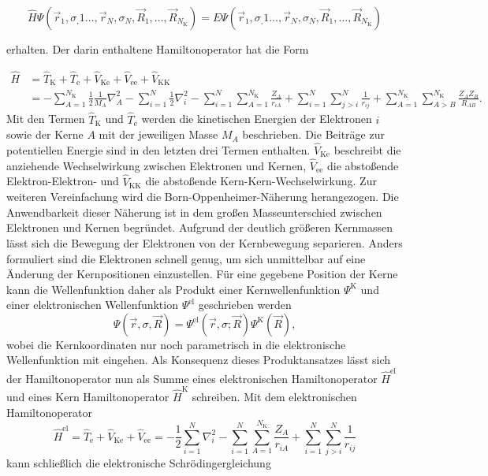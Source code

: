 \begin{equation}
  \hat{H}\Psi(\vec{r}_1,\sigma_,1\dotsc,\vec{r}_N,\sigma_N,\vec{R}_1,\dotsc,\vec{R}_{N_{\text{K}}})=E\Psi(\vec{r}_1,\sigma_,1\dotsc,\vec{r}_N,\sigma_N,\vec{R}_1,\dotsc,\vec{R}_{N_{\text{K}}})
\end{equation}

erhalten. Der darin enthaltene Hamiltonoperator hat die Form

\begin{equation}
\begin{aligned}
  \hat{H}&=\hat{T}_{\text{K}}+\hat{T}_{\text{e}}+\hat{V}_{\text{Ke}}+\hat{V}_{\text{ee}}+\hat{V}_{\text{KK}}\\
  &=-\sum_{A=1}^{N_\text{K}}\frac{1}{2}\frac{1}{M_A}\nabla^2_A-\sum_{i=1}^N\frac{1}{2}\nabla^2_i-\sum_{i=1}^N\sum_{A=1}^{N_\text{K}}\frac{Z_A}{r_{iA}}+\sum_{i=1}^N\sum_{j>i}^N\frac{1}{r_{ij}}+\sum_{A=1}^{N_\text{K}}\sum_{A>B}^{N_\text{K}}\frac{Z_AZ_B}{R_{AB}}.
\end{aligned}
\end{equation}
Mit den Termen $\hat{T}_{\text{K}}$ und $\hat{T}_{\text{e}}$ werden die kinetischen Energien der Elektronen $i$ sowie der Kerne $A$ mit der jeweiligen Masse $M_A$ beschrieben. Die Beiträge zur potentiellen Energie sind in den letzten drei Termen enthalten. $\hat{V}_{\text{Ke}}$ beschreibt die anziehende Wechselwirkung zwischen Elektronen und Kernen, $\hat{V}_{\text{ee}}$ die abstoßende Elektron-Elektron- und $\hat{V}_{\text{KK}}$ die abstoßende Kern-Kern-Wechselwirkung.
Zur weiteren Vereinfachung wird die Born-Oppenheimer-Näherung\supercite{born1927quantentheorie} herangezogen. Die Anwendbarkeit dieser Näherung ist in dem großen Masseunterschied zwischen Elektronen und Kernen begründet. Aufgrund der deutlich größeren Kernmassen lässt sich die Bewegung der Elektronen von der Kernbewegung separieren. Anders formuliert sind die Elektronen schnell genug, um sich unmittelbar auf eine Änderung der Kernpositionen einzustellen. Für eine gegebene Position der Kerne kann die Wellenfunktion daher als Produkt einer Kernwellenfunktion $\Psi^{\text{K}}$ und einer elektronischen Wellenfunktion $\Psi^{\text{el}}$ geschrieben werden
\begin{equation}
\Psi(\vec{r},\sigma,\vec{R})=\Psi^{\text{el}}(\vec{r},\sigma;\vec{R})\Psi^{\text{K}}(\vec{R}),
\end{equation}
wobei die Kernkoordinaten nur noch parametrisch in die elektronische Wellenfunktion mit eingehen. Als Konsequenz dieses Produktansatzes lässt sich der Hamiltonoperator nun als Summe eines elektronischen Hamiltonoperator $\hat{H}^{\text{el}}$ und eines Kern Hamiltonoperator $\hat{H}^{\text{K}}$ schreiben. Mit dem elektronischen Hamiltonoperator
\begin{equation}\label{eq:elhamilton}
  \hat{H}^{\text{el}}=\hat{T}_{\text{e}}+\hat{V}_{\text{Ke}}+\hat{V}_{\text{ee}}=-\frac{1}{2}\sum_{i=1}^N\nabla^2_i-\sum_{i=1}^N\sum_{A=1}^{N_\text{K}}\frac{Z_A}{r_{iA}}+\sum_{i=1}^N\sum_{j>i}^N\frac{1}{r_{ij}}
\end{equation}
kann schließlich die elektronische Schrödingergleichung 

